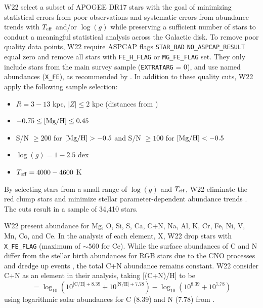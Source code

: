 \documentclass[modern]{aastex631}
\newcommand{\mgh}{[{\rm Mg}/{\rm H}]}
\newcommand{\logg}{\log(g)}
\newcommand{\teff}{T_{\rm eff}}
\newcommand{\ejg}[1]{\textcolor{red}{EJG: #1}}
\begin{document}
W22 select a subset of APOGEE DR17 stars with the goal of minimizing statistical errors from poor observations and systematic errors from abundance trends with $\teff$ and/or $\logg$ while preserving a sufficient number of stars to conduct a meaningful statistical analysis across the Galactic disk. To remove poor quality data points, W22 require ASPCAP flags \texttt{STAR\_BAD} \texttt{NO\_ASPCAP\_RESULT} equal zero and remove all stars with \texttt{FE\_H\_FLAG} or \texttt{MG\_FE\_FLAG} set. They only include stars from the main survey sample (\texttt{EXTRATARG} = 0), and use named abundances (\texttt{X\_FE}), as recommended by \citet{jonsson2020}. In addition to these quality cuts, W22 apply the following sample selection:
\begin{itemize}
\itemsep0em
    \item $R=3-13$ kpc, $|Z| \leq 2$ kpc (distances from \citealp{leung2019})
    \item $-0.75 \leq \mgh \leq 0.45$
    \item S/N $\geq 200$ for $\mgh > -0.5$ and S/N $\geq 100$ for $\mgh < -0.5$
    \item $\logg = 1-2.5$ dex
    \item $\teff = 4000-4600$ K
\end{itemize}
By selecting stars from a small range of $\logg$ and $\teff$, W22 eliminate the red clump stars \citep{vincenzo2021a} and minimize stellar parameter-dependent abundance trends \citep[see][]{griffith2021a}. The cuts result in a sample of 34,410 stars. 

W22 present abundance for Mg, O, Si, S, Ca, C+N, Na, Al, K, Cr, Fe, Ni, V, Mn, Co, and Ce. In the analysis of each element, X, W22 drop stars with \texttt{X\_FE\_FLAG} (maximum of $\sim 560$ for Ce). While the surface abundances of C and N differ from the stellar birth abundances for RGB stars due to the CNO processes and dredge up events \citep{iben1965, shetrone2019}, the total C+N abundance remains constant. W22 consider C+N as an element in their analysis, taking [(C+N)/H] to be 
\begin{equation}
    [\text{C+N}/\text{H}] = \log_{10}(10^{\text{[C/H]}+8.39} + 10^{\text{[N/H]}+7.78}) - \log_{10}(10^{8.39} + 10^{7.78})
\end{equation}
using logarithmic solar abundances for C (8.39) and N (7.78) from \citet{grevesse2007}.

\end{document}
